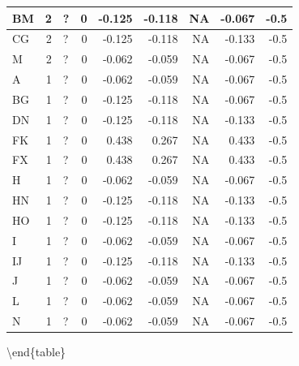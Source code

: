 \documentclass[
  letterpaper,
  DIV=11,
  numbers=noendperiod]{scrreprt}
\begin{document}
\begin{tabular}[t]{l|r|l|r|r|r|r|r|r}
\hline
\hspace{1em}BM & 2 & ? & 0 & -0.125 & -0.118 & NA & -0.067 & -0.5\\
\hline
\hspace{1em}CG & 2 & ? & 0 & -0.125 & -0.118 & NA & -0.133 & -0.5\\
\hline
\hspace{1em}M & 2 & ? & 0 & -0.062 & -0.059 & NA & -0.067 & -0.5\\
\hline
\hspace{1em}A & 1 & ? & 0 & -0.062 & -0.059 & NA & -0.067 & -0.5\\
\hline
\hspace{1em}BG & 1 & ? & 0 & -0.125 & -0.118 & NA & -0.067 & -0.5\\
\hline
\hspace{1em}DN & 1 & ? & 0 & -0.125 & -0.118 & NA & -0.133 & -0.5\\
\hline
\hspace{1em}FK & 1 & ? & 0 & 0.438 & 0.267 & NA & 0.433 & -0.5\\
\hline
\hspace{1em}FX & 1 & ? & 0 & 0.438 & 0.267 & NA & 0.433 & -0.5\\
\hline
\hspace{1em}H & 1 & ? & 0 & -0.062 & -0.059 & NA & -0.067 & -0.5\\
\hline
\hspace{1em}HN & 1 & ? & 0 & -0.125 & -0.118 & NA & -0.133 & -0.5\\
\hline
\hspace{1em}HO & 1 & ? & 0 & -0.125 & -0.118 & NA & -0.133 & -0.5\\
\hline
\hspace{1em}I & 1 & ? & 0 & -0.062 & -0.059 & NA & -0.067 & -0.5\\
\hline
\hspace{1em}IJ & 1 & ? & 0 & -0.125 & -0.118 & NA & -0.133 & -0.5\\
\hline
\hspace{1em}J & 1 & ? & 0 & -0.062 & -0.059 & NA & -0.067 & -0.5\\
\hline
\hspace{1em}L & 1 & ? & 0 & -0.062 & -0.059 & NA & -0.067 & -0.5\\
\hline
\hspace{1em}N & 1 & ? & 0 & -0.062 & -0.059 & NA & -0.067 & -0.5\\
\hline
\end{tabular}

\textbackslash end\{table\}
\end{document}
